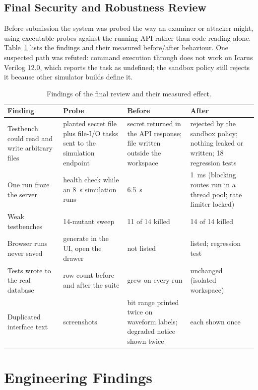\documentclass[11pt,a4paper]{article}
\newcommand{\code}[1]{\texttt{\detokenize{#1}}}
\begin{document}
\subsection{Final Security and Robustness Review}
\label{sec:review}
Before submission the system was probed the way an examiner or attacker might, using executable probes against the running API rather than code reading alone. Table~\ref{tab:review} lists the findings and their measured before/after behaviour. One suspected path was refuted: command execution through \code{$system()} does not work on Icarus Verilog 12.0, which reports the task as undefined; the sandbox policy still rejects it because other simulator builds define it.

\begin{table}[H]
\centering
\caption{Findings of the final review and their measured effect.}
\label{tab:review}
\footnotesize
\begin{tabularx}{\textwidth}{@{}p{3.1cm}p{3.7cm}p{3.2cm}X@{}}
\toprule
\textbf{Finding} & \textbf{Probe} & \textbf{Before} & \textbf{After} \\
\midrule
Testbench could read and write arbitrary files & planted secret file plus file-I/O tasks sent to the simulation endpoint & secret returned in the API response; file written outside the workspace & rejected by the sandbox policy; nothing leaked or written; 18 regression tests \\
One run froze the server & health check while an 8~s simulation runs & 6.5~s & 1~ms (blocking routes run in a thread pool; rate limiter locked) \\
Weak testbenches & 14-mutant sweep & 11 of 14 killed & 14 of 14 killed \\
Browser runs never saved & generate in the UI, open the drawer & not listed & listed; regression test \\
Tests wrote to the real database & row count before and after the suite & grew on every run & unchanged (isolated workspace) \\
Duplicated interface text & screenshots & bit range printed twice on waveform labels; degraded notice shown twice & each shown once \\
\bottomrule
\end{tabularx}
\end{table}

\section{Engineering Findings}
\label{sec:discussion}
\end{document}
